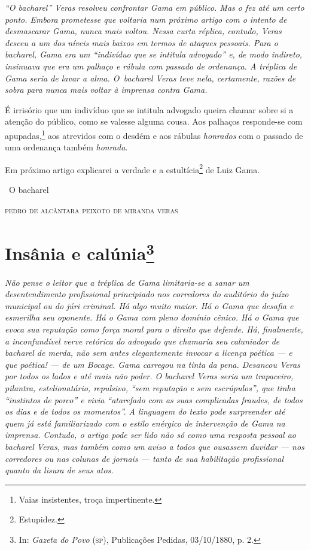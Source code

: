 \begin{resumo}
\emph{``O bacharel'' Veras resolveu confrontar Gama em público. Mas o fez
até um certo ponto. Embora prometesse que voltaria num próximo artigo
com o intento de desmascarar Gama, nunca mais voltou. Nessa curta
réplica, contudo, Veras desceu a um dos níveis mais baixos em termos de
ataques pessoais. Para o bacharel, Gama era um ``indivíduo que se
intitula advogado'' e, de modo indireto, insinuava que era um palhaço e
rábula com passado de ordenança. A tréplica de Gama seria de lavar a
alma. O~bacharel Veras teve nela, certamente, razões de sobra para nunca
mais voltar à imprensa contra Gama. }
\end{resumo}

É irrisório que um indivíduo que se intitula advogado queira chamar
sobre si a atenção do público, como se valesse alguma cousa. Aos
palhaços responde-se com apupadas,\footnote{Vaias insistentes, troça
  impertinente.} aos atrevidos com o desdém e aos rábulas
\emph{honrados} com o passado de uma ordenança também \emph{honrada}.

Em próximo artigo explicarei a verdade e a estultícia\footnote{
  Estupidez.} de Luiz Gama.\medskip

\hfill\ O bacharel

\hfill\textsc{pedro de alcântara peixoto de miranda veras}

\chapter{Insânia e calúnia\footnote{In: \emph{Gazeta do Povo}
  (\textsc{sp}), Publicações Pedidas, 03/10/1880, p. 2.}}


\begin{resumo}
\emph{Não pense o leitor que a tréplica de Gama limitaria-se a sanar um
desentendimento profissional principiado nos corredores do auditório do
juízo municipal ou do júri criminal. Há algo muito maior. Há o Gama
que desafia e esmerilha seu oponente. Há o Gama com pleno domínio
cênico. Há o Gama que evoca sua reputação como força moral para o
direito que defende. Há, finalmente, a inconfundível verve retórica do
advogado que chamaria seu caluniador de bacharel de merda, não sem antes
elegantemente invocar a licença poética --- e que poética! --- de um
Bocage. Gama carregou na tinta da pena. Desancou Veras por todos os
lados e até mais não poder. O bacharel Veras seria um trapaceiro,
pilantra, estelionatário, repulsivo, ``sem reputação e sem escrúpulos'',
que tinha ``instintos de porco'' e vivia ``atarefado com as suas
complicadas fraudes, de todos os dias e de todos os momentos''. A
linguagem do texto pode surpreender até quem já está familiarizado com o
estilo enérgico de intervenção de Gama na imprensa. Contudo, o artigo
pode ser lido não só como uma resposta pessoal ao bacharel Veras, mas
também como um aviso a todos que ousassem duvidar --- nos corredores ou
nas colunas de jornais --- tanto de sua habilitação profissional quanto
da lisura de seus atos.}
\end{resumo}

